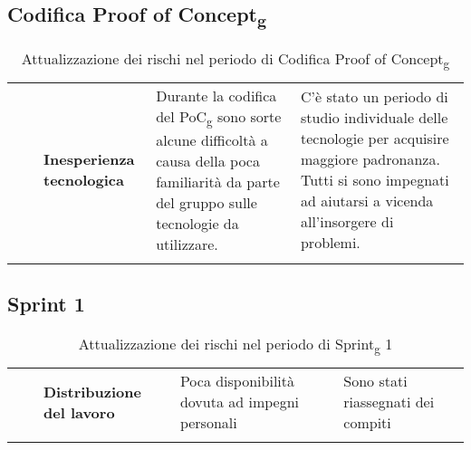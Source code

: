 \subsection{Codifica Proof of Concept\textsubscript{g}}
\begin{longtable}{ 
	>{\centering}M{0.20\textwidth} 
	>{\raggedright}M{0.30\textwidth}
	>{\raggedright}M{0.40\textwidth}
	}
	\rowcolorhead
	\centering 
	 &	
	 &
	\endfirsthead	
	\endhead
	
	\textbf{Inesperienza tecnologica} & 
    Durante la codifica del PoC\textsubscript{g} sono sorte alcune difficoltà a causa della poca
    familiarità da parte del gruppo sulle tecnologie da utilizzare. & 
    C'è stato un periodo di studio individuale delle tecnologie per acquisire maggiore padronanza. 
    Tutti si sono impegnati ad aiutarsi a vicenda all'insorgere di problemi. \tabularnewline
	\captionline \caption{Attualizzazione dei rischi nel periodo di Codifica Proof of Concept\textsubscript{g}}
\end{longtable}

\subsection{Sprint 1}
\begin{longtable}{ 
	>{\centering}M{0.20\textwidth} 
	>{\raggedright}M{0.30\textwidth}
	>{\raggedright}M{0.40\textwidth}
	}
	\rowcolorhead
	\centering 
	 &	
	 &
	\endfirsthead	
	\endhead
	
	\textbf{Distribuzione del lavoro} & Poca disponibilità dovuta ad impegni personali & Sono stati riassegnati dei 
	compiti \tabularnewline
	\captionline \caption{Attualizzazione dei rischi nel periodo di Sprint\textsubscript{g} 1}
\end{longtable}